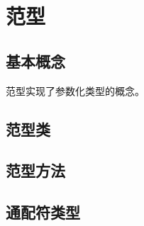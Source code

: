 \chapter{范型}

\label{chap:generics}

\section{基本概念}

范型实现了参数化类型的概念。

\section{范型类}


\section{范型方法}

\section{通配符类型}
